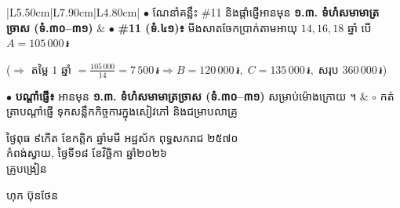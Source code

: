 \documentclass[a4paper,10pt]{article}
\newcommand{\riel}{\,\text{៛}}
\begin{document}
\begin{longtable}{|L{5.50cm}|L{7.90cm}|L{4.80cm}|}
$\bullet$ ណែនាំគន្លឹះ \#11 និងផ្ដាំផ្ញើអានមុន \textbf{១.៣. ទំហំសមាមាត្រច្រាស (ទំ.៣០–៣១)}
&
$\bullet$ \textbf{\#11 (ទំ.៤១)៖} មីងសាតចែកប្រាក់តាមអាយុ $14, 16, 18$ ឆ្នាំ បើ $A=105\,000\riel$ \par
\hspace*{0.3cm}($\Rightarrow$ តម្លៃ $1$ ឆ្នាំ $= \frac{105\,000}{14}=7\,500\riel \Rightarrow B=120\,000\riel,\; C=135\,000\riel,\; \text{សរុប } 360\,000\riel$) \par
$\bullet$ \textbf{បណ្ដាំផ្ញើ៖} អានមុន \textbf{១.៣. ទំហំសមាមាត្រច្រាស (ទំ.៣០–៣១)} សម្រាប់ម៉ោងក្រោយ ។
&
$\circ$ កត់ត្រាបណ្ដាំផ្ញើ ទុកសន្លឹកកិច្ចការក្នុងសៀវភៅ និងជម្រាបលាគ្រូ \\
\end{longtable}

\vspace{8pt}
\hfill
\begin{minipage}{10.5cm}
  {\centering
    ថ្ងៃពុធ ៩កើត ខែកត្តិក ឆ្នាំមមី អដ្ឋស័ក ពុទ្ធសករាជ ២៥៧០\\[2pt]
    កំពង់ស្វាយ, ថ្ងៃទី១៨ ខែវិច្ឆិកា ឆ្នាំ២០២៦\\[3pt]
    {\muol គ្រូបង្រៀន}\par}
  \vspace{30pt}
  \hfill{\muol ហុក ប៊ុនថែន}\hspace*{1.4cm}
\end{minipage}
\end{document}
